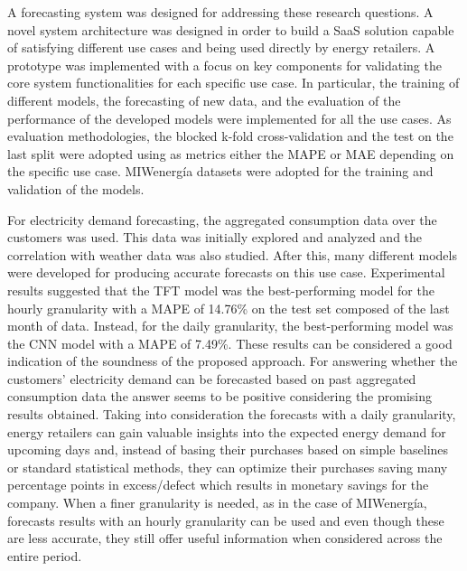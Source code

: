 A forecasting system was designed for addressing these research questions.
A novel system architecture was designed in order to build a SaaS solution capable of satisfying different use cases and being used directly by energy retailers.
A prototype was implemented with a focus on key components for validating the core system functionalities for each specific use case.
In particular, the training of different models, the forecasting of new data, and the evaluation of the performance of the developed models were implemented for all the use cases.
As evaluation methodologies, the blocked k-fold cross-validation and the test on the last split were adopted using as metrics either the MAPE or MAE depending on the specific use case.
MIWenergía datasets were adopted for the training and validation of the models.

For electricity demand forecasting, the aggregated consumption data over the customers was used.
This data was initially explored and analyzed and the correlation with weather data was also studied.
After this, many different models were developed for producing accurate forecasts on this use case.
Experimental results suggested that the TFT model was the best-performing model for the hourly granularity with a MAPE of 14.76\% on the test set composed of the last month of data.
Instead, for the daily granularity, the best-performing model was the CNN model with a MAPE of 7.49\%.
These results can be considered a good indication of the soundness of the proposed approach.
For answering whether the customers' electricity demand can be forecasted based on past aggregated consumption data the answer seems to be positive considering the promising results obtained.
Taking into consideration the forecasts with a daily granularity, energy retailers can gain valuable insights into the expected energy demand for upcoming days and, instead of basing their purchases based on simple baselines or standard statistical methods, they can optimize their purchases saving many percentage points in excess/defect which results in monetary savings for the company.
When a finer granularity is needed, as in the case of MIWenergía, forecasts results with an hourly granularity can be used and even though these are less accurate, they still offer useful information when considered across the entire period.

